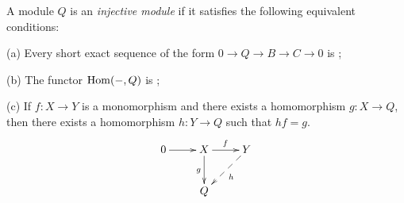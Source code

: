 \documentclass{article}
\begin{document}
A module $Q$ is an {\it injective module}
if it satisfies the following equivalent conditions:

(a) Every short exact sequence
of the form $0 \to Q \to B \to C \to 0$ 
is ;

(b) The functor ${\rm Hom}(-, Q)$ 
is ;

(c) If $f : X \to Y$ is a monomorphism
and there exists a homomorphism $g : X \to Q$,
then there exists a homomorphism $h : Y \to Q$
such that $hf = g$.
$$
\xymatrix{
  0
        \ar[r]
  &
  X
        \ar[d]_g
        \ar[r]^f
  &
  Y
        \ar@{-->}[dl]^h
  \\
  &
  Q
}
$$
\end{document}
